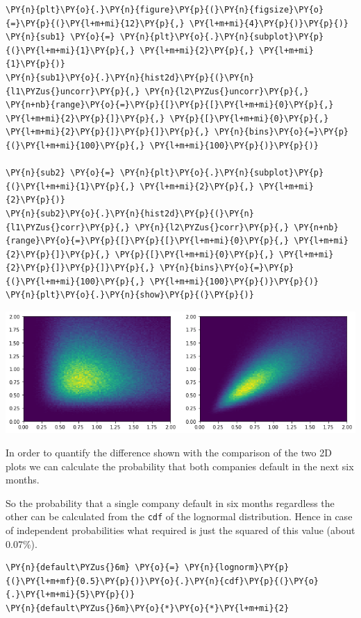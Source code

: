 \begin{Answer}
\begin{tcolorbox}[size=fbox, boxrule=1pt, colback=cellbackground, colframe=cellborder]
\begin{Verbatim}[commandchars=\\\{\}]
\PY{n}{plt}\PY{o}{.}\PY{n}{figure}\PY{p}{(}\PY{n}{figsize}\PY{o}{=}\PY{p}{(}\PY{l+m+mi}{12}\PY{p}{,} \PY{l+m+mi}{4}\PY{p}{)}\PY{p}{)}
\PY{n}{sub1} \PY{o}{=} \PY{n}{plt}\PY{o}{.}\PY{n}{subplot}\PY{p}{(}\PY{l+m+mi}{1}\PY{p}{,} \PY{l+m+mi}{2}\PY{p}{,} \PY{l+m+mi}{1}\PY{p}{)}
\PY{n}{sub1}\PY{o}{.}\PY{n}{hist2d}\PY{p}{(}\PY{n}{l1\PYZus{}uncorr}\PY{p}{,} \PY{n}{l2\PYZus{}uncorr}\PY{p}{,} \PY{n+nb}{range}\PY{o}{=}\PY{p}{[}\PY{p}{[}\PY{l+m+mi}{0}\PY{p}{,} \PY{l+m+mi}{2}\PY{p}{]}\PY{p}{,} \PY{p}{[}\PY{l+m+mi}{0}\PY{p}{,} \PY{l+m+mi}{2}\PY{p}{]}\PY{p}{]}\PY{p}{,} \PY{n}{bins}\PY{o}{=}\PY{p}{(}\PY{l+m+mi}{100}\PY{p}{,} \PY{l+m+mi}{100}\PY{p}{)}\PY{p}{)}
		
\PY{n}{sub2} \PY{o}{=} \PY{n}{plt}\PY{o}{.}\PY{n}{subplot}\PY{p}{(}\PY{l+m+mi}{1}\PY{p}{,} \PY{l+m+mi}{2}\PY{p}{,} \PY{l+m+mi}{2}\PY{p}{)}
\PY{n}{sub2}\PY{o}{.}\PY{n}{hist2d}\PY{p}{(}\PY{n}{l1\PYZus{}corr}\PY{p}{,} \PY{n}{l2\PYZus{}corr}\PY{p}{,} \PY{n+nb}{range}\PY{o}{=}\PY{p}{[}\PY{p}{[}\PY{l+m+mi}{0}\PY{p}{,} \PY{l+m+mi}{2}\PY{p}{]}\PY{p}{,} \PY{p}{[}\PY{l+m+mi}{0}\PY{p}{,} \PY{l+m+mi}{2}\PY{p}{]}\PY{p}{]}\PY{p}{,} \PY{n}{bins}\PY{o}{=}\PY{p}{(}\PY{l+m+mi}{100}\PY{p}{,} \PY{l+m+mi}{100}\PY{p}{)}\PY{p}{)}
\PY{n}{plt}\PY{o}{.}\PY{n}{show}\PY{p}{(}\PY{p}{)}
\end{Verbatim}
\end{tcolorbox}

\begin{center}
	\includegraphics{figures/copula_lognormal.png}
\end{center}

In order to quantify the difference shown with the comparison of the two 2D plots we can calculate the probability that both companies default in the next six months.

So the probability that a single company default in six months regardless the other can be calculated from the \texttt{cdf} of the lognormal distribution.
Hence in case of independent probabilities what required is just the squared of this value
(about 0.07\%).
\begin{tcolorbox}[size=fbox, boxrule=1pt, colback=cellbackground, colframe=cellborder]
\begin{Verbatim}[commandchars=\\\{\}]
\PY{n}{default\PYZus{}6m} \PY{o}{=} \PY{n}{lognorm}\PY{p}{(}\PY{l+m+mf}{0.5}\PY{p}{)}\PY{o}{.}\PY{n}{cdf}\PY{p}{(}\PY{o}{.}\PY{l+m+mi}{5}\PY{p}{)}
\PY{n}{default\PYZus{}6m}\PY{o}{*}\PY{o}{*}\PY{l+m+mi}{2}


\end{Verbatim}
\end{tcolorbox}
\end{Answer}
